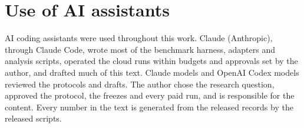 \section*{Use of AI assistants}

AI coding assistants were used throughout this work. Claude (Anthropic), through Claude Code, wrote most of the
benchmark harness, adapters and analysis scripts, operated the cloud runs within budgets and approvals set by the
author, and drafted much of this text. Claude models and OpenAI Codex models reviewed the protocols and drafts. The author
chose the research question, approved the protocol, the freezes and every paid run, and is responsible for the content.
Every number in the text is generated from the released records by the released scripts.
